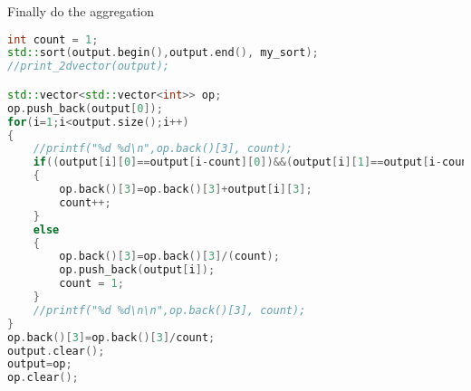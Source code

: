 Finally do the aggregation
\begin{lstlisting}[language=C++]
int count = 1;
std::sort(output.begin(),output.end(), my_sort);
//print_2dvector(output);

std::vector<std::vector<int>> op;
op.push_back(output[0]);
for(i=1;i<output.size();i++)
{
    //printf("%d %d\n",op.back()[3], count);
    if((output[i][0]==output[i-count][0])&&(output[i][1]==output[i-count][1])&&(output[i][2]==output[i-count][2]))
    {
        op.back()[3]=op.back()[3]+output[i][3];
        count++;
    }
    else
    {
        op.back()[3]=op.back()[3]/(count);
        op.push_back(output[i]);
        count = 1;
    }
    //printf("%d %d\n\n",op.back()[3], count);
}
op.back()[3]=op.back()[3]/count;
output.clear();
output=op;
op.clear();
\end{lstlisting}

